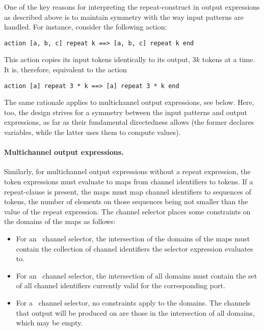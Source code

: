 \begin{rationale}
  One of the key reasons for interpreting the repeat-construct in
  output expressions as described above is to maintain
  symmetry with the way input patterns are handled. For instance,
  consider the following action:

  {\tt action [a, b, c] repeat k ==> [a, b, c] repeat k end}

  This action copies its input tokens identically to its output, $3k$
  tokens at a time. It is, therefore, equivalent to the action

  {\tt action [a] repeat 3 * k ==> [a] repeat 3 * k end}
  
  The same rationale applies to multichannel output expressions, see
  below. Here, too, the design strives for a symmetry between the
  input patterns and output expressions, as far as their fundamental
  directedness allows (the former declares variables, while the latter
  uses them to compute values).
\end{rationale}


\paragraph{Multichannel output expressions.}
Similarly, for multichannel output expressions without a repeat
expression,
the token expressions must evaluate to maps from channel identifiers
to tokens. If a repeat-clause is present, the maps must map channel
identifiers to sequences of tokens, the number of elements on those
sequences being not smaller than the value of the repeat expression.
The channel selector places some constraints on the domains of the
maps as follows:
\begin{itemize}
\item For an \kwAtN~channel selector, the intersection of the domains
  of the maps must contain the collection of channel identifiers the
  selector expression evaluates to.
\item For an \kwAll~channel selector, the intersection of all domains
  must contain the set of all channel identifiers currently valid for
  the corresponding port.
\item For a \kwAny~channel selector, no constraints apply to the
  domains. The channels that output will be produced on are those in
  the intersection of all domains, which may be empty.
\end{itemize}

